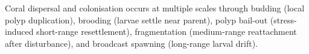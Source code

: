 




Coral dispersal and colonisation occurs at multiple scales through budding (local polyp duplication), brooding (larvae settle near parent), polyp bail-out (stress-induced short-range resettlement), fragmentation (medium-range reattachment after disturbance), and broadcast spawning (long-range larval drift).

